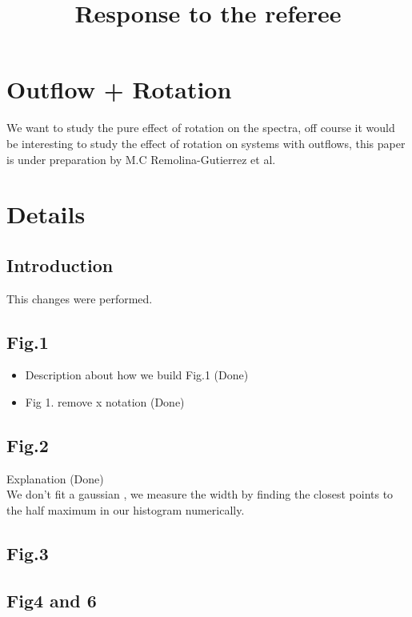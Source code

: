 \documentclass[12pt]{article}
\title{Response to the referee}
\begin{document}
\date{}
\maketitle

\section*{Outflow + Rotation}

We want to study the pure effect of rotation on the spectra, off course it would
be interesting to study the effect of rotation on systems with outflows, this paper
is under preparation by M.C Remolina-Gutierrez et al.  

\section*{Details}

\subsection*{Introduction}

This changes were performed.

\subsection*{Fig.1}

\begin{itemize}
\item Description about how we build Fig.1 (Done)
\item Fig 1. remove x notation (Done)
\end{itemize}

\subsection*{Fig.2}

Explanation (Done)\\
We don't fit a gaussian , we measure the width by finding
the closest points to the half maximum in our histogram numerically.

\subsection*{Fig.3}



\subsection*{Fig4 and 6}
\end{document}

